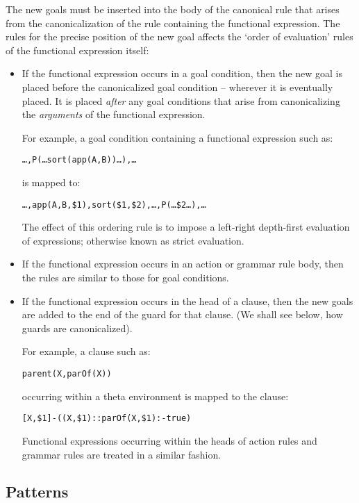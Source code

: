 The new goals must be inserted into the body of the canonical rule that arises from the canonicalization of the rule  containing the functional expression. The rules for the precise position of the new goal affects the `order of evaluation' rules of the functional expression itself:

\begin{itemize}
\item
If the functional expression occurs in a goal condition, then the new goal is placed before the canonicalized goal condition -- wherever it is eventually placed. It is placed \emph{after} any goal conditions that arise from canonicalizing the \emph{arguments} of the functional expression.

For example, a goal condition containing a functional  expression such as:
\begin{alltt}
\ldots,P(\ldots{}sort(app(A,B))\ldots),\ldots
\end{alltt}
is mapped to:
\begin{alltt}
\ldots,app(A,B,\$1),sort(\$1,\$2),\ldots,P(\ldots\$2\ldots),\ldots
\end{alltt}
The effect of this ordering rule is to impose a left-right depth-first evaluation of expressions; otherwise known as strict evaluation.

\item
If the functional expression occurs in an action or grammar rule body, then the rules are similar to those for goal conditions.

\item
If the functional expression occurs in the head of a clause, then the new goals are added to the end of the guard for that clause. (We shall see below, how guards are canonicalized).

For example, a clause such as:
\begin{alltt}
parent(X,parOf(X))
\end{alltt}
occurring within a theta environment is mapped to the clause:
\begin{alltt}
[X,\$1]-((X,\$1)::parOf(X,\$1):-true)
\end{alltt}
Functional expressions occurring within the heads of action rules and grammar rules are treated in a similar fashion.
\end{itemize}

\subsection{Patterns}
\label{canonical:pattern}

